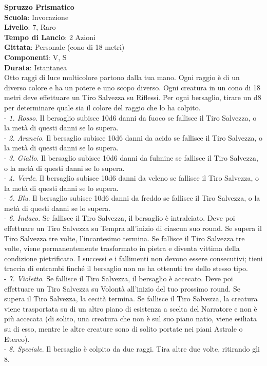 \begin{multicols}{2}
\medskip\textbf{Spruzzo Prismatico}\\
\textbf{Scuola}: Invocazione\\
\textbf{Livello}: 7, Raro\\
\textbf{Tempo di Lancio}: 2 Azioni\\
\textbf{Gittata}: Personale (cono di 18 metri)\\
\textbf{Componenti}: V, S\\
\textbf{Durata}: Istantanea\\
Otto raggi di luce multicolore partono dalla tua mano. Ogni raggio è di un diverso colore e ha un potere e uno scopo diverso. Ogni creatura in un cono di 18 metri deve effettuare un Tiro Salvezza su Riflessi. Per ogni bersaglio, tirare un d8 per determinare quale sia il colore del raggio che lo ha colpito.\\

- \textit{1. Rosso}. Il bersaglio subisce 10d6 danni da fuoco se fallisce il Tiro Salvezza, o la metà di questi danni se lo supera.\\
- \textit{2. Arancio}. Il bersaglio subisce 10d6 danni da acido se fallisce il Tiro Salvezza, o la metà di questi danni se lo supera.\\
- \textit{3. Giallo}. Il bersaglio subisce 10d6 danni da fulmine se fallisce il Tiro Salvezza, o la metà di questi danni se lo supera.\\
- \textit{4. Verde}. Il bersaglio subisce 10d6 danni da veleno se fallisce il Tiro Salvezza, o la metà di questi danni se lo supera.\\
- \textit{5. Blu}. Il bersaglio subisce 10d6 danni da freddo se fallisce il Tiro Salvezza, o la metà di questi danni se lo supera.\\
- \textit{6. Indaco}. Se fallisce il Tiro Salvezza, il bersaglio è intralciato. Deve poi effettuare un Tiro Salvezza su Tempra all'inizio di ciascun suo round. Se supera il Tiro Salvezza tre volte, l'incantesimo termina. Se fallisce il Tiro Salvezza tre volte, viene permanentemente trasformato in pietra e diventa vittima della condizione pietrificato. I successi e i fallimenti non devono essere consecutivi; tieni traccia di entrambi finché il bersaglio non ne ha ottenuti tre dello stesso tipo.\\
- \textit{7. Violetto}. Se fallisce il Tiro Salvezza, il bersaglio è accecato. Deve poi effettuare un Tiro Salvezza su Volontà all'inizio del tuo prossimo round. Se supera il Tiro Salvezza, la cecità termina. Se fallisce il Tiro Salvezza, la creatura viene trasportata su di un altro piano di esistenza a scelta del Narratore e non è più accecata (di solito, una creatura che non è sul suo piano natio, viene esiliata su di esso, mentre le altre creature sono di solito portate nei piani Astrale o Etereo).\\
- \textit{8. Speciale}. Il bersaglio è colpito da due raggi. Tira altre due volte, ritirando gli 8.


\end{multicols}
